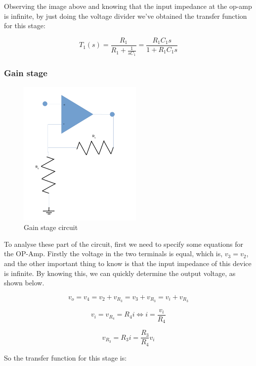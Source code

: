 Observing the image above and knowing that the input impedance at the op-amp is infinite, by just doing the voltage divider we've obtained the transfer function for this stage:

\begin{equation}
T_1(s) = \frac{R_1}{R_1 + \frac{1}{sC_1}} = \frac{R_1C_1s}{1+R_1C_1s}
\end{equation}   

\subsubsection{Gain stage}

\begin{figure}[H] 
\centering
\includegraphics[width= 6cm]{amp_l5.pdf} 
\caption{Gain stage circuit}
\label{gainstage}
\end{figure}

To analyse these part of the circuit, first we need to specify some equations for the OP-Amp. 
Firstly the voltage in the two terminals is equal, which is, $v_3 = v_2$, and the other important thing to know is that the input impedance of this device is infinite. By knowing this, we can quickly determine the output voltage, as shown below.

\begin{equation}
v_o = v_4 = v_2 + v_{R_3} = v_3 + v_{R_3} = v_i + v_{R_3}
\end{equation} 

\begin{equation}
v_i = v_{R_4} = R_4i \iff i = \frac{v_i}{R_4}
\end{equation}

\begin{equation}
v_{R_3} = R_3i = \frac{R_3}{R_4}v_i
\end{equation}

So the transfer function for this stage is:

